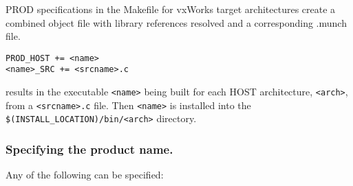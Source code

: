 PROD specifications in the Makefile for vxWorks target architectures create a combined object file with library 
references resolved and a corresponding .munch file.

\begin{verbatim}
PROD_HOST += <name>
<name>_SRC += <srcname>.c
\end{verbatim}

results in the executable \verb|<name>| being built for each HOST architecture,  \verb|<arch>|, from a \verb|<srcname>.c| file. Then \verb|<name>| 
is installed into the \verb|$(INSTALL_LOCATION)/bin/<arch>| directory. 

\subsubsection{Specifying the product name.}

Any of the following can be specified:

